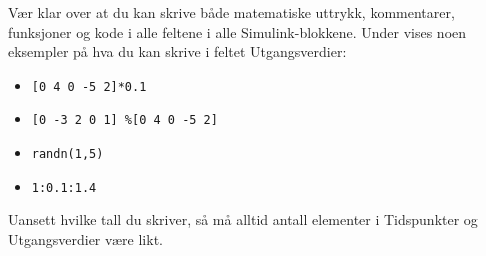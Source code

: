   {\color{blue}Vær klar over at du kan skrive både matematiske
    uttrykk,  kommentarer, funksjoner og kode i
  alle feltene i alle Simulink-blokkene. Under vises noen eksempler på hva du kan
  skrive i feltet  {\sf Utgangsverdier}:
  \begin{itemize}
    \setlength\itemsep{0mm}
  \item  {\tt [0~4~0~-5~2]*0.1}
  \item  {\tt [0~-3~2~0~1]  \hspace*{3mm} \%[0~4~0~-5~2] } 
  \item  {\tt randn(1,5)}
  \item  {\tt 1:0.1:1.4}
  \end{itemize}
  Uansett hvilke tall du skriver, så må alltid antall elementer i
  {\sf  Tidspunkter} og {\sf Utgangsverdier} være likt.
}
